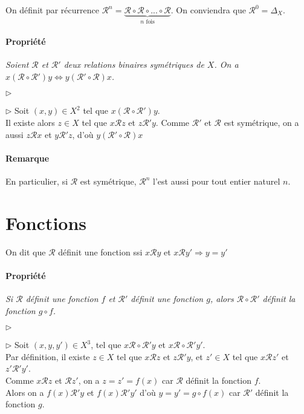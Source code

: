 \documentclass{scrartcl}
\begin{document}
		On définit par récurrence $\mathcal{R}^n = \underbrace{\mathcal{R}\circ\mathcal{R}\circ...\circ\mathcal{R}}_{n \text{ fois}}$.
		On conviendra que $\mathcal{R}^0 = \Delta_X$. 

		\paragraph{Propriété} \textsl{Soient $\mathcal{R}$ et $\mathcal{R'}$ deux relations binaires symétriques de $X$. 
		On a $x\left(\mathcal{R}\circ\mathcal{R'}\right)y \Leftrightarrow y\left(\mathcal{R'}\circ\mathcal{R}\right)x$.}
		\begin{labeling}{$\triangleright$}
			\item [$\triangleright$] Soit $(x,y)\in X^2$ tel que $x\left(\mathcal{R}\circ\mathcal{R}'\right)y$.\\
			Il existe alors $z \in X$ tel que $x\mathcal{R}z$ et $z\mathcal{R'}y$. 
			Comme $\mathcal{R'}$ et $\mathcal{R}$ est symétrique, on a aussi $z\mathcal{R}x$ et $y\mathcal{R'}z$,
			d'où $y\left(\mathcal{R'}\circ\mathcal{R}\right)x$
		\end{labeling}

		\paragraph{Remarque} En particulier, si $\mathcal{R}$ est symétrique, $\mathcal{R}^n$ l'est aussi pour tout entier naturel $n$.

	\section{Fonctions}
		On dit que $\mathcal{R}$ définit une fonction ssi $x\mathcal{R}y$ et $x\mathcal{R}y' \Rightarrow y = y'$

		\paragraph{Propriété} \textsl{Si $\mathcal{R}$ définit une fonction $f$ et $\mathcal{R}'$ définit une fonction $g$, 
			alors $\mathcal{R}\circ\mathcal{R}'$ définit la fonction $g\circ f$.}
		\begin{labeling}{$\triangleright$}
			\item [$\triangleright$] Soit $(x,y,y') \in X^3$, 
			tel que $x\mathcal{R}\circ\mathcal{R'}y$ et $x\mathcal{R}\circ\mathcal{R'}y'$. \\
			Par définition, il existe $z \in X$ tel que $x\mathcal{R}z$ et $z\mathcal{R}'y$, 
			et $z' \in X$ tel que $x\mathcal{R}z'$ et $z'\mathcal{R}'y'$.\\
			Comme $x\mathcal{R}z$ et $\mathcal{R}z'$, on a $z=z'=f(x)$ car $\mathcal{R}$ définit la fonction $f$. \\
			Alors on a $f(x)\mathcal{R}'y$ et $f(x)\mathcal{R}'y'$ d'où $y=y'=g\circ f(x)$ car $\mathcal{R}'$ définit la fonction $g$.
		\end{labeling}
\end{document}
